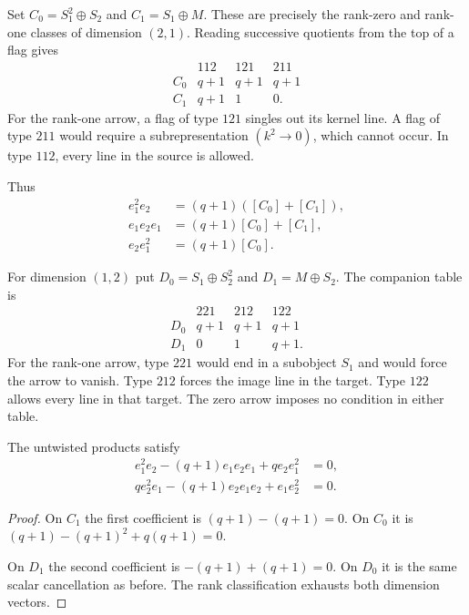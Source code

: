 Set $C_0=S_1^2\oplus S_2$ and $C_1=S_1\oplus M$.  These are precisely
the rank-zero and rank-one classes of dimension $(2,1)$.  Reading successive
quotients from the top of a flag gives
\begin{equation}\label{cbc:hall:table21}
\begin{array}{c|ccc}
 &112&121&211\\ \hline
 C_0&q+1&q+1&q+1\\
 C_1&q+1&1&0.
\end{array}
\end{equation}
For the rank-one arrow, a flag of type $121$ singles out its kernel line.
A flag of type $211$ would require a subrepresentation $(k^2\to0)$, which
cannot occur.  In type $112$, every line in the source is allowed.

Thus
\begin{align*}
 e_1^2e_2&=(q+1)([C_0]+[C_1]),\\
 e_1e_2e_1&=(q+1)[C_0]+[C_1],\\
 e_2e_1^2&=(q+1)[C_0].
\end{align*}

For dimension $(1,2)$ put $D_0=S_1\oplus S_2^2$ and $D_1=M\oplus S_2$.
The companion table is
\begin{equation}\label{cbc:hall:table12}
\begin{array}{c|ccc}
 &221&212&122\\ \hline
 D_0&q+1&q+1&q+1\\
 D_1&0&1&q+1.
\end{array}
\end{equation}
For the rank-one arrow, type $221$ would end in a subobject $S_1$ and would
force the arrow to vanish.  Type $212$ forces the image line in the target.
Type $122$ allows every line in that target.  The zero arrow imposes no
condition in either table.

\begin{theorem}\label{thm:hall-serre}
The untwisted products satisfy
\begin{align*}
 e_1^2e_2-(q+1)e_1e_2e_1+qe_2e_1^2&=0,\\
 qe_2^2e_1-(q+1)e_2e_1e_2+e_1e_2^2&=0.
\end{align*}
\end{theorem}
\begin{proof}
On $C_1$ the first coefficient is $(q+1)-(q+1)=0$.  On $C_0$ it is
$(q+1)-(q+1)^2+q(q+1)=0$.

On $D_1$ the second coefficient is $-(q+1)+(q+1)=0$.  On $D_0$ it is the
same scalar cancellation as before.
The rank classification exhausts both dimension vectors.
\end{proof}

